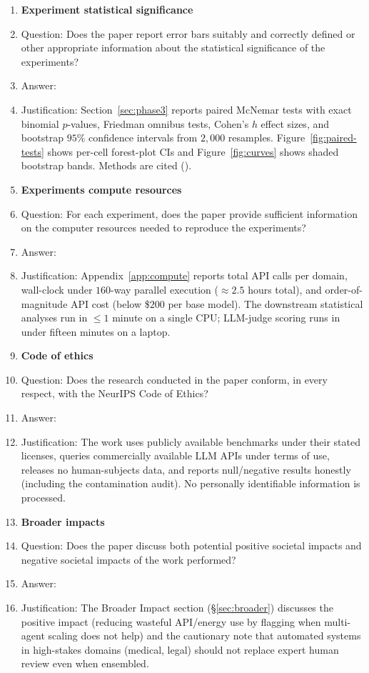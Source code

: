 \begin{enumerate}
\item {\bf Experiment statistical significance}
    \item[] Question: Does the paper report error bars suitably and correctly defined or other appropriate information about the statistical significance of the experiments?
    \item[] Answer: \answerYes{}
    \item[] Justification: Section~\ref{sec:phase3} reports paired McNemar tests with exact binomial $p$-values, Friedman omnibus tests, Cohen's $h$ effect sizes, and bootstrap $95\%$ confidence intervals from $2{,}000$ resamples. Figure~\ref{fig:paired-tests} shows per-cell forest-plot CIs and Figure~\ref{fig:curves} shows shaded bootstrap bands. Methods are cited (\citet{mcnemar1947,cohen1988,efron1993bootstrap}).

\item {\bf Experiments compute resources}
    \item[] Question: For each experiment, does the paper provide sufficient information on the computer resources needed to reproduce the experiments?
    \item[] Answer: \answerYes{}
    \item[] Justification: Appendix~\ref{app:compute} reports total API calls per domain, wall-clock under $160$-way parallel execution ($\approx$$2.5$ hours total), and order-of-magnitude API cost (below \$$200$ per base model). The downstream statistical analyses run in $\leq$$1$ minute on a single CPU; LLM-judge scoring runs in under fifteen minutes on a laptop.

\item {\bf Code of ethics}
    \item[] Question: Does the research conducted in the paper conform, in every respect, with the NeurIPS Code of Ethics?
    \item[] Answer: \answerYes{}
    \item[] Justification: The work uses publicly available benchmarks under their stated licenses, queries commercially available LLM APIs under terms of use, releases no human-subjects data, and reports null/negative results honestly (including the contamination audit). No personally identifiable information is processed.

\item {\bf Broader impacts}
    \item[] Question: Does the paper discuss both potential positive societal impacts and negative societal impacts of the work performed?
    \item[] Answer: \answerYes{}
    \item[] Justification: The Broader Impact section (\S\ref{sec:broader}) discusses the positive impact (reducing wasteful API/energy use by flagging when multi-agent scaling does not help) and the cautionary note that automated systems in high-stakes domains (medical, legal) should not replace expert human review even when ensembled.


\end{enumerate}

